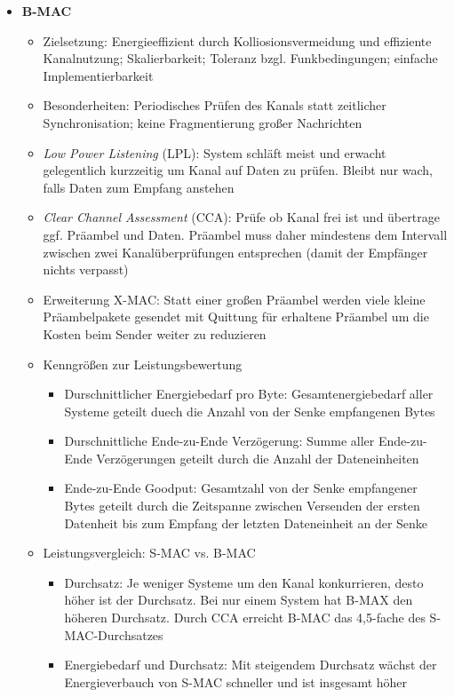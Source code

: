 \begin{itemize}
\begin{itemize}
	\end{itemize}
	\item \textbf{B-MAC}
	\begin{itemize}
		\item Zielsetzung: Energieeffizient durch Kolliosionsvermeidung und effiziente Kanalnutzung; Skalierbarkeit; Toleranz bzgl. Funkbedingungen; einfache Implementierbarkeit
		\item Besonderheiten: Periodisches Prüfen des Kanals statt zeitlicher Synchronisation; keine Fragmentierung großer Nachrichten
		\item \textit{Low Power Listening} (LPL): System schläft meist und erwacht gelegentlich kurzzeitig um Kanal auf Daten zu prüfen. Bleibt nur wach, falls Daten zum Empfang anstehen
		\item \textit{Clear Channel Assessment} (CCA): Prüfe ob Kanal frei ist und übertrage ggf. Präambel und Daten. Präambel muss daher mindestens dem Intervall zwischen zwei Kanalüberprüfungen entsprechen (damit der Empfänger nichts verpasst)
		\item Erweiterung X-MAC: Statt einer großen Präambel werden viele kleine Präambelpakete gesendet mit Quittung für erhaltene Präambel um die Kosten beim Sender weiter zu reduzieren
		\item Kenngrößen zur Leistungsbewertung
		\begin{itemize}
			\item Durschnittlicher Energiebedarf pro Byte: Gesamtenergiebedarf aller Systeme geteilt duech die Anzahl von der Senke empfangenen Bytes
			\item Durschnittliche Ende-zu-Ende Verzögerung: Summe aller Ende-zu-Ende Verzögerungen geteilt durch die Anzahl der Dateneinheiten
			\item Ende-zu-Ende Goodput: Gesamtzahl von der Senke empfangener Bytes geteilt durch die Zeitspanne zwischen Versenden der ersten Datenheit bis zum Empfang der letzten Dateneinheit an der Senke
		\end{itemize}
		\item Leistungsvergleich: S-MAC vs. B-MAC
		\begin{itemize}
			\item Durchsatz: Je weniger Systeme um den Kanal konkurrieren, desto höher ist der Durchsatz. Bei nur einem System hat B-MAX den höheren Durchsatz. Durch CCA erreicht B-MAC das 4,5-fache des S-MAC-Durchsatzes
			\item Energiebedarf und Durchsatz: Mit steigendem Durchsatz wächst der Energieverbauch von S-MAC schneller und ist insgesamt höher

\end{itemize}
\end{itemize}
\end{itemize}
